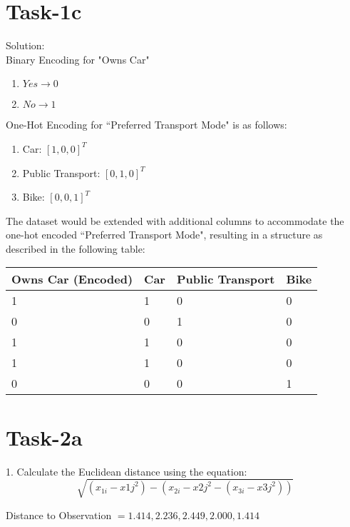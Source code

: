 \documentclass{article}
\begin{document}
\section{Task-1c}

Solution: \\
Binary Encoding for "Owns Car"
\begin{enumerate}
    \item $Yes \rightarrow 0$
    \item $No \rightarrow 1$
\end{enumerate}

\noindent
One-Hot Encoding for ``Preferred Transport Mode" is as follows:
\begin{enumerate}
    \item Car: $[1,0,0]^T$
    \item Public Transport: $[0,1,0]^T$
    \item Bike: $[0,0,1]^T$
\end{enumerate}

The dataset would be extended with additional columns to accommodate the one-hot encoded ``Preferred
Transport Mode", resulting in a structure as described in the following table: \\

\noindent
\begin{tabular}{ |p{4cm}|p{2cm}|p{4cm}|p{2cm}|  }
    
    \hline
    Owns Car (Encoded)&Car &Public Transport&Bike\\
    \hline
    1&1&0&0\\
    0&0&1&0\\
    1&1&0&0\\
    1&1&0&0\\
    0&0&0&1\\
    
    \hline
\end{tabular}


\section{Task-2a}
1. Calculate the Euclidean distance using the equation:\\

\begin{equation}
    \sqrt{(x_{1i}-x{1j}^2)-(x_{2i}-x{2j}^2-(x_{3i}-x{3j}^2))}
\end{equation}

\noindent 
Distance to Observation $= 1.414, 2.236, 2.449, 2.000, 1.414$\\
\end{document}
